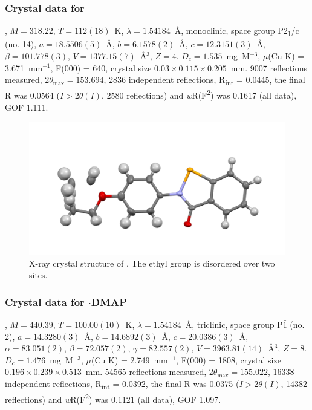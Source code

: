 \begin{refsection}
\subsubsection{Crystal data for \texorpdfstring{}{C15 H13 N O2 Se}}
, $M=318.22$, $T=112(18)$~K, $\lambda=1.54184$~\AA, monoclinic, space group P2\textsubscript{1}/c (no. 14), $a = 18.5506(5)$~\AA, $b = 6.1578(2)$~\AA, $c = 12.3151(3)$~\AA, $\beta = 101.778(3)$\degree, $V = 1377.15(7)$~\AA$^{3}$, $Z = 4$. $D_{c}= 1.535$~mg~M$^{-3}$, $\mu$(Cu K\a) = 3.671~mm$^{-1}$, F(000) = 640, crystal size $0.03 \times 0.115 \times 0.205$~mm. 9007 reflections measured, $2\theta_{\mathrm{max}}=153.694$\degree, 2836 independent reflections, R\textsubscript{int} = 0.0445, the final R was 0.0564 ($I > 2\theta(I)$, 2580 reflections) and \emph{w}R(F\textsuperscript{2}) was 0.1617 (all data), GOF 1.111.

\begin{figure}
  \includegraphics[width=0.6\linewidth]{Figures/ebs-4oet-xtal.pdf}
  \caption[X-ray crystal structure of \texorpdfstring{}{C15 H13 N O2 Se}.]{X-ray crystal structure of \texorpdfstring{}{C15 H13 N O2 Se}. The ethyl group is disordered over two sites.}
\end{figure}

\subsubsection{Crystal data for \texorpdfstring{$\cdot$DMAP}{C22 H23 N3 O2 Se}}
, $M=440.39$, $T=100.00(10)$~K, $\lambda=1.54184$~\AA, triclinic, space group P$\bar{1}$ (no. 2), $a = 14.3280(3)$~\AA, $b = 14.6892(3)$~\AA, $c = 20.0386(3)$~\AA, $\alpha = 83.051(2)$\degree, $\beta = 72.057(2)$\degree, $\gamma = 82.557(2)$\degree, $V = 3963.81(14)$~\AA$^{3}$, $Z = 8$. $D_{c}= 1.476$~mg~M$^{-3}$, $\mu$(Cu K\a) = 2.749~mm$^{-1}$, F(000) = 1808, crystal size $0.196 \times 0.239 \times 0.513$~mm. 54565 reflections measured, $2\theta_{\mathrm{max}}=155.022$\degree, 16338 independent reflections, R\textsubscript{int} = 0.0392, the final R was 0.0375 ($I > 2\theta(I)$, 14382 reflections) and \emph{w}R(F\textsuperscript{2}) was 0.1121 (all data), GOF 1.097.


\end{refsection}
